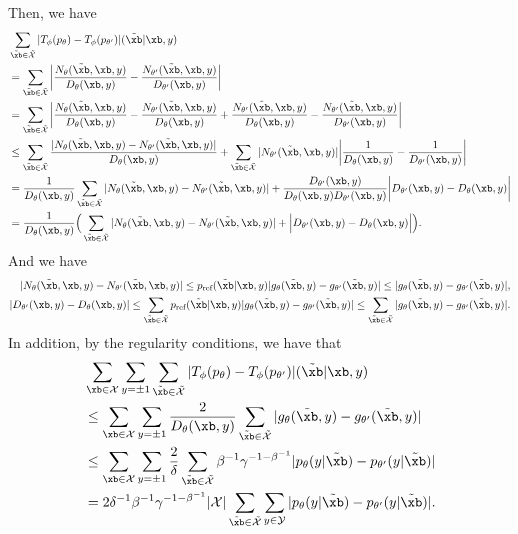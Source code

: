 Then, we have
\begin{align*}
    & \sum_{\tilde\xb\in\tilde{\mathcal{X}}}|T_\phi(p_\theta) - T_\phi(p_{\theta'})|(\tilde\xb|\xb,y) \\
    & = \sum_{\tilde\xb\in\tilde{\mathcal{X}}} \bigg| \frac{N_\theta(\tilde\xb,\xb,y)}{D_\theta(\xb,y)} - \frac{N_{\theta'}(\tilde\xb,\xb,y)}{D_{\theta'}(\xb,y)} \bigg| \\
    & = \sum_{\tilde\xb\in\tilde{\mathcal{X}}} \bigg| \frac{N_\theta(\tilde\xb,\xb,y)}{D_\theta(\xb,y)} - \frac{N_{\theta'}(\tilde\xb,\xb,y)}{D_\theta(\xb,y)} + \frac{N_{\theta'}(\tilde\xb,\xb,y)}{D_\theta(\xb,y)}- \frac{N_{\theta'}(\tilde\xb,\xb,y)}{D_{\theta'}(\xb,y)} \bigg| \\
    & \le \sum_{\tilde\xb\in\tilde{\mathcal{X}}} \frac{|N_\theta(\tilde\xb,\xb,y) - N_{\theta'}(\tilde\xb,\xb,y) |}{D_\theta(\xb,y)} + \sum_{\tilde\xb\in\tilde{\mathcal{X}}} |N_{\theta'}(\tilde\xb,\xb,y) | \bigg|\frac{1}{D_{\theta}(\xb,y)} - \frac{1}{D_{\theta'}(\xb,y)}\bigg| \\
    & = \frac{1}{D_\theta(\xb,y)} \sum_{\tilde\xb\in\tilde{\mathcal{X}}} {|N_\theta(\tilde\xb,\xb,y) - N_{\theta'}(\tilde\xb,\xb,y) |} + \frac{D_{\theta'}(\xb,y)}{D_{\theta}(\xb,y) D_{\theta'}(\xb,y)}\bigg|  D_{\theta'}(\xb,y) - D_{\theta}(\xb,y)\bigg| \\
    & = \frac{1}{D_\theta(\xb,y)} \Big( \sum_{\tilde\xb\in\tilde{\mathcal{X}}} {|N_\theta(\tilde\xb,\xb,y) - N_{\theta'}(\tilde\xb,\xb,y) |} +  \Big|  D_{\theta'}(\xb,y) - D_{\theta}(\xb,y)\Big| \Big).
\end{align*}
And we have
\begin{align*}
|N_\theta(\tilde\xb,\xb,y) - N_{\theta'}(\tilde\xb,\xb,y)| \le     p_{\text{ref}}(\tilde{\xb}|\xb,y)|g_\theta(\tilde\xb,y) - g_{\theta'}(\tilde\xb,y)| \le |g_\theta(\tilde\xb,y) - g_{\theta'}(\tilde\xb,y)|,\\
|D_{\theta'}(\xb,y) -  D_\theta(\xb,y) | \le \sum_{\tilde\xb\in\tilde{\mathcal{X}}} p_{\text{ref}} (\tilde{\xb}|\xb,y)|g_\theta(\tilde\xb,y) - g_{\theta'}(\tilde\xb,y)|  \le \sum_{\tilde\xb\in\tilde{\mathcal{X}}} |g_\theta(\tilde\xb,y) - g_{\theta'}(\tilde\xb,y)|.
\end{align*}
In addition, by the regularity conditions, we have that
\begin{align*}
    & \sum_{\xb\in\mathcal{X}} \sum_{y=\pm 1} \sum_{\tilde\xb\in\tilde{\mathcal{X}}}|T_\phi(p_\theta) - T_\phi(p_{\theta'})|(\tilde\xb|\xb, y) \\ 
    &\le \sum_{\xb\in\mathcal{X}}  \sum_{y=\pm 1} \frac{2}{D_\theta(\xb,y)} \sum_{\tilde\xb\in\tilde{\mathcal{X}}} |g_\theta(\tilde\xb,y) - g_{\theta'}(\tilde\xb,y)|\\
    &\le \sum_{\xb\in\mathcal{X}}  \sum_{y=\pm 1} \frac{2}{\delta} \sum_{\tilde\xb\in\tilde{\mathcal{X}}} \beta^{-1} \gamma^{-1-\beta^{-1}} |p_\theta(y|\tilde\xb) - p_{\theta'}(y|\tilde\xb)| \\
    & = 2 \delta^{-1} \beta^{-1} \gamma^{-1-\beta^{-1}} |\mathcal{X}|\sum_{\tilde\xb\in\tilde{\mathcal{X}}} \sum_{y \in 
    \mathcal{Y}}|p_\theta(y|\tilde\xb) - p_{\theta'}(y|\tilde\xb)|.
\end{align*}

